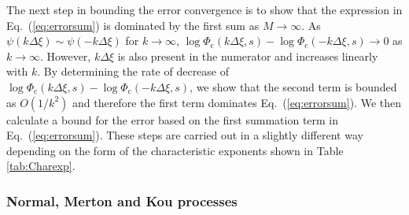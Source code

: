 \documentclass[11pt,a4paper]{article}
\begin{document}
The next step in bounding the error convergence is to show that the expression in Eq.~(\ref{eq:errorsum}) is dominated by the first sum as $M\rightarrow\infty$. As $\psi(k\Delta\xi) \sim \psi(-k\Delta\xi)$ for $k\to\infty$, $\log \Phi_{\mathrm{c}}(k\Delta\xi,s)\!-\!\log \Phi_{\mathrm{c}}(-k\Delta\xi,s)\rightarrow0$ as $k\rightarrow\infty$. However, $k\Delta\xi$ is also present in the numerator and increases linearly with $k$. By determining the rate of decrease of $\log \Phi_{\mathrm{c}}(k\Delta\xi,s)\!-\!\log \Phi_{\mathrm{c}}(-k\Delta\xi,s)$, we show that the second term is bounded as $O(1/k^2)$ and therefore the first term dominates Eq.~(\ref{eq:errorsum}). We then calculate a bound for the error based on the first summation term in Eq.~(\ref{eq:errorsum}). These steps are carried out in a slightly different way depending on the form of the characteristic exponents shown in Table \ref{tab:Charexp}.

\subsubsection{Normal, Merton and Kou processes}\label{sec:error_fact_norm}
\end{document}
